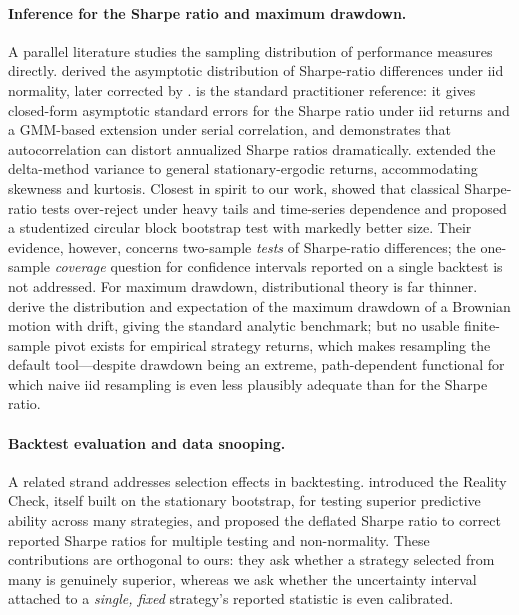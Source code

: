 \documentclass[11pt]{article}
\begin{document}
\paragraph{Inference for the Sharpe ratio and maximum drawdown.} A parallel
literature studies the sampling distribution of performance measures directly.
\citet{jobson1981performance} derived the asymptotic distribution of
Sharpe-ratio differences under iid normality, later corrected by
\citet{memmel2003performance}. \citet{lo2002statistics} is the standard
practitioner reference: it gives closed-form asymptotic standard errors for the
Sharpe ratio under iid returns and a GMM-based extension under serial
correlation, and demonstrates that autocorrelation can distort annualized
Sharpe ratios dramatically. \citet{opdyke2007comparing} extended the
delta-method variance to general stationary-ergodic returns, accommodating
skewness and kurtosis. Closest in spirit to our work, \citet{ledoit2008robust}
showed that classical Sharpe-ratio tests over-reject under heavy tails and
time-series dependence and proposed a studentized circular block bootstrap test
with markedly better size. Their evidence, however, concerns two-sample
\emph{tests} of Sharpe-ratio differences; the one-sample \emph{coverage}
question for confidence intervals reported on a single backtest is not
addressed. For maximum drawdown, distributional theory is far thinner.
\citet{magdonismail2004maximum} derive the distribution and expectation of the
maximum drawdown of a Brownian motion with drift, giving the standard analytic
benchmark; but no usable finite-sample pivot exists for empirical strategy
returns, which makes resampling the default tool---despite drawdown being an
extreme, path-dependent functional for which naive iid resampling is even less
plausibly adequate than for the Sharpe ratio.

\paragraph{Backtest evaluation and data snooping.} A related strand addresses
selection effects in backtesting. \citet{white2000reality} introduced the
Reality Check, itself built on the stationary bootstrap, for testing superior
predictive ability across many strategies, and \citet{bailey2014deflated}
proposed the deflated Sharpe ratio to correct reported Sharpe ratios for
multiple testing and non-normality. These contributions are orthogonal to ours:
they ask whether a strategy selected from many is genuinely superior, whereas
we ask whether the uncertainty interval attached to a \emph{single, fixed}
strategy's reported statistic is even calibrated.
\end{document}
